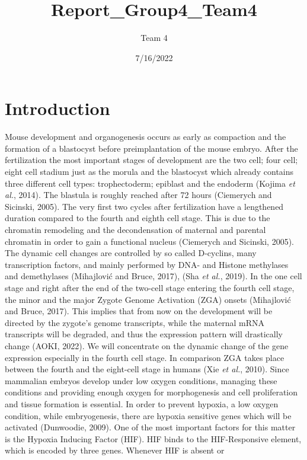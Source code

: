\documentclass[
  parskip,
  oneside]{scrreprt}
\title{Report\_Group4\_Team4}
\author{Team 4}
\date{7/16/2022}
\begin{document}
\maketitle

\hypertarget{introduction}{%
\chapter{Introduction}\label{introduction}}

Mouse development and organogenesis occurs as early as compaction and
the formation of a blastocyst before preimplantation of the mouse
embryo. After the fertilization the most important stages of development
are the two cell; four cell; eight cell stadium just as the morula and
the blastocyst which already contains three different cell types:
trophectoderm; epiblast and the endoderm (Kojima \emph{et al.}, 2014).
The blastula is roughly reached after 72 hours (Ciemerych and Sicinski,
2005). The very first two cycles after fertilization have a lengthened
duration compared to the fourth and eighth cell stage. This is due to
the chromatin remodeling and the decondensation of maternal and parental
chromatin in order to gain a functional nucleus (Ciemerych and Sicinski,
2005). The dynamic cell changes are controlled by so called D-cyclins,
many transcription factors, and mainly performed by DNA- and Histone
methylases and demethylases (Mihajlović and Bruce, 2017), (Sha \emph{et
al.}, 2019). In the one cell stage and right after the end of the
two-cell stage entering the fourth cell stage, the minor and the major
Zygote Genome Activation (ZGA) onsets (Mihajlović and Bruce, 2017). This
implies that from now on the development will be directed by the
zygote's genome transcripts, while the maternal mRNA transcripts will be
degraded, and thus the expression pattern will drastically change (AOKI,
2022). We will concentrate on the dynamic change of the gene expression
especially in the fourth cell stage. In comparison ZGA takes place
between the fourth and the eight-cell stage in humans (Xie \emph{et
al.}, 2010). Since mammalian embryos develop under low oxygen
conditions, managing these conditions and providing enough oxygen for
morphogenesis and cell proliferation and tissue formation is essential.
In order to prevent hypoxia, a low oxygen condition, while
embryogenesis, there are hypoxia sensitive genes which will be activated
(Dunwoodie, 2009). One of the most important factors for this matter is
the Hypoxia Inducing Factor (HIF). HIF binds to the HIF-Responsive
element, which is encoded by three genes. Whenever HIF is absent or
\end{document}
